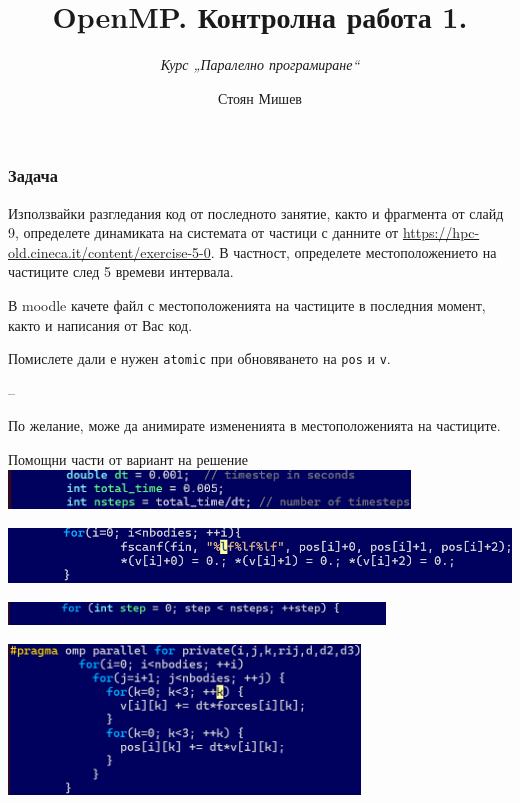 \documentclass{beamer}
\title{OpenMP. Контролна работа 1.}
\subtitle{\textit{Курс „Паралелно програмиране“}}
\author{\newline \newline Стоян Мишев}
\date{} %
\begin{document}
\lstset{language=Python}
{ 
\frame{\titlepage}}



\begin{frame}
  \frametitle{Задача}
  Използвайки разгледания код от последното занятие, както и фрагмента от слайд 9,
  определете динамиката на системата от частици с данните от
  \url{https://hpc-old.cineca.it/content/exercise-5-0}. В частност,
  определете местоположението на частиците след 5 времеви интервала.

  В moodle качете файл с местоположенията на частиците в последния момент, както и написания от Вас код.
  
  Помислете дали е нужен \texttt{atomic} при обновяването на \texttt{pos} и \texttt{v}.

  --

  По желание, може да анимирате измененията в местоположенията на частиците.
\end{frame}

\begin{frame}{Помощни части от вариант на решение}
  \includegraphics[width=0.8\textwidth]{help1}

  \includegraphics[width=\textwidth]{help2}

  \includegraphics[width=0.75\textwidth]{help3}

  \includegraphics[width=0.7\textwidth]{help4}
\end{frame}
\end{document}
